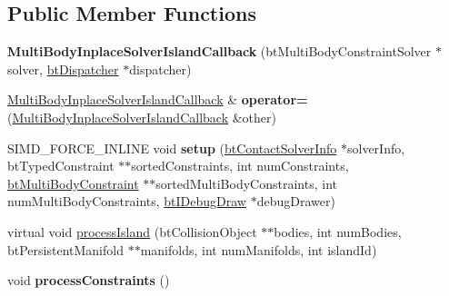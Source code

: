 \subsection*{Public Member Functions}
\begin{DoxyCompactItemize}
\item 
\mbox{\label{structMultiBodyInplaceSolverIslandCallback_afc065e540c1a1d196b4999f28b5f9b00}} 
{\bfseries Multi\+Body\+Inplace\+Solver\+Island\+Callback} (bt\+Multi\+Body\+Constraint\+Solver $\ast$solver, \hyperlink{classbtDispatcher}{bt\+Dispatcher} $\ast$dispatcher)
\item 
\mbox{\label{structMultiBodyInplaceSolverIslandCallback_a67fab240335e82b736d1439c808e0c2f}} 
\hyperlink{structMultiBodyInplaceSolverIslandCallback}{Multi\+Body\+Inplace\+Solver\+Island\+Callback} \& {\bfseries operator=} (\hyperlink{structMultiBodyInplaceSolverIslandCallback}{Multi\+Body\+Inplace\+Solver\+Island\+Callback} \&other)
\item 
\mbox{\label{structMultiBodyInplaceSolverIslandCallback_aadb9f513e26d8b8b257bea2a65668725}} 
S\+I\+M\+D\+\_\+\+F\+O\+R\+C\+E\+\_\+\+I\+N\+L\+I\+NE void {\bfseries setup} (\hyperlink{structbtContactSolverInfo}{bt\+Contact\+Solver\+Info} $\ast$solver\+Info, bt\+Typed\+Constraint $\ast$$\ast$sorted\+Constraints, int num\+Constraints, \hyperlink{classbtMultiBodyConstraint}{bt\+Multi\+Body\+Constraint} $\ast$$\ast$sorted\+Multi\+Body\+Constraints, int num\+Multi\+Body\+Constraints, \hyperlink{classbtIDebugDraw}{bt\+I\+Debug\+Draw} $\ast$debug\+Drawer)
\item 
virtual void \hyperlink{structMultiBodyInplaceSolverIslandCallback_a4de885af1dc5369ee882827e010afd4b}{process\+Island} (bt\+Collision\+Object $\ast$$\ast$bodies, int num\+Bodies, bt\+Persistent\+Manifold $\ast$$\ast$manifolds, int num\+Manifolds, int island\+Id)
\item 
\mbox{\label{structMultiBodyInplaceSolverIslandCallback_a4c687c04438636edf95ad84ac3774501}} 
void {\bfseries process\+Constraints} ()
\end{DoxyCompactItemize}
